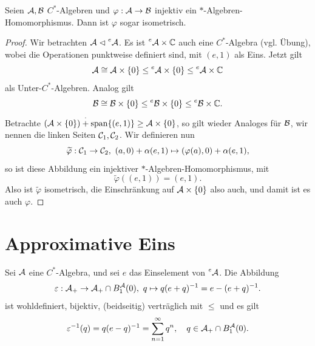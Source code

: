 \begin{proposition}
    Seien $\mathcal{A}, \mathcal{B}$ $C^*$-Algebren und $\varphi : \mathcal{A} \to \mathcal{B}$ injektiv ein $\ast$-Algebren-Homomorphismus. Dann ist $\varphi$ sogar isometrisch.
\end{proposition}

\begin{proof}
    Wir betrachten $\mathcal{A} \vartriangleleft \prescript{e}{}{\mathcal{A}}$. Es ist $\prescript{e}{}{\mathcal{A}} \times \mathbb{C}$ auch eine $C^*$-Algebra (vgl. Übung), wobei die Operationen punktweise definiert sind, mit $(e, 1)$ als Eins. Jetzt gilt
    $$ \mathcal{A} \cong \mathcal{A} \times \{ 0 \} \leq \prescript{e}{}{\mathcal{A}} \times \{ 0 \} \leq \prescript{e}{}{\mathcal{A}} \times \mathbb{C} $$
    als Unter-$C^*$-Algebren. Analog gilt
    $$ \mathcal{B} \cong \mathcal{B} \times \{ 0 \} \leq \prescript{e}{}{\mathcal{B}} \times \{ 0 \} \leq \prescript{e}{}{\mathcal{B}} \times \mathbb{C}. $$
    Betrachte $ (\mathcal{A} \times \{ 0 \}) \overset{\cdot}{+} \mathrm{span} \{ (e, 1) \} \geq \mathcal{A} \times \{ 0 \}$, so gilt wieder Analoges für $\mathcal{B}$, wir nennen die linken Seiten $\mathcal{C}_1, \mathcal{C}_2$. Wir definieren nun
    $$ \widetilde{\varphi} : \mathcal{C}_1 \to \mathcal{C}_2, \ (a, 0) + \alpha (e, 1) \mapsto (\varphi(a), 0) + \alpha(e, 1), $$
    so ist diese Abbildung ein injektiver $\ast$-Algebren-Homomorphismus, mit
    \[
        \widetilde{\varphi}((e, 1)) = (e, 1).
    \]
    Also ist $\widetilde{\varphi}$ isometrisch, die Einschränkung auf $\mathcal{A} \times \{0\}$ also auch, und damit ist es auch $\varphi$.
\end{proof}

\chapter{Approximative Eins}

\begin{lemma}
    Sei $\mathcal{A}$ eine $C^*$-Algebra, und sei $e$ das Einselement von $\prescript{e}{}{\mathcal{A}}$. Die Abbildung
    \[
        \varepsilon : \mathcal{A}_+ \to \mathcal{A}_+ \cap B_1^{\mathcal{A}}(0), \ q \mapsto q(e + q)^{-1} = e - (e+q)^{-1}.
    \]
    ist wohldefiniert, bijektiv, (beidseitig) verträglich mit $\leq$ und es gilt
    $$ \varepsilon^{-1}(q) = q(e - q)^{-1} = \sum_{n=1}^\infty q^n, \quad q \in \mathcal{A}_+ \cap B_1^{\mathcal{A}}(0). $$
\end{lemma}

